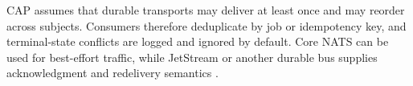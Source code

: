CAP assumes that durable transports may deliver at least once and may reorder across subjects. Consumers therefore deduplicate by job or idempotency key, and terminal-state conflicts are logged and ignored by default. Core NATS can be used for best-effort traffic, while JetStream or another durable bus supplies acknowledgment and redelivery semantics \citep{nats}.
